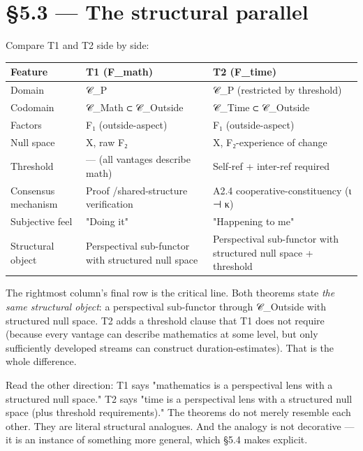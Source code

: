 \documentclass[11pt, openany]{book}
\newcommand{\sectionbreak}{\clearpage}
\begin{document}
\sectionbreak

\section{§5.3 --- The structural parallel}

Compare T1 and T2 side by side:

\begingroup\setlength{\tabcolsep}{3pt}\renewcommand{\arraystretch}{1.15}\footnotesize
\begin{center}
\begin{tabular}{p{0.62in} p{1.66in} p{2.05in}}
\toprule
Feature & T1 (F\_\allowbreak{}math) & T2 (F\_\allowbreak{}time) \\
\midrule
Domain & 𝒞\_\allowbreak{}P & 𝒞\_\allowbreak{}P (restricted by threshold) \\
Codomain & 𝒞\_\allowbreak{}Math ⊂ 𝒞\_\allowbreak{}Outside & 𝒞\_\allowbreak{}Time ⊂ 𝒞\_\allowbreak{}Outside \\
Factors & F₁ (outside-aspect) & F₁ (outside-aspect) \\
Null space & X, raw F₂ & X, F₂-experience of change \\
Threshold & --- (all vantages describe math) & Self-ref + inter-ref required \\
Consensus mechanism & Proof /\allowbreak  shared-structure verification & A2.4 cooperative-constituency (ι ⊣ κ) \\
Subjective feel & "Doing it" & "Happening to me" \\
Structural object & Perspectival sub-functor with structured null space & Perspectival sub-functor with structured null space + threshold \\
\bottomrule
\end{tabular}
\end{center}
\endgroup
The rightmost column's final row is the critical line. Both theorems state \textit{the same structural object}: a perspectival sub-functor through 𝒞\_\allowbreak{}Outside with structured null space. T2 adds a threshold clause that T1 does not require (because every vantage can describe mathematics at some level, but only sufficiently developed streams can construct duration-estimates). That is the whole difference.

Read the other direction: T1 says "mathematics is a perspectival lens with a structured null space." T2 says "time is a perspectival lens with a structured null space (plus threshold requirements)." The theorems do not merely resemble each other. They are literal structural analogues. And the analogy is not decorative --- it is an instance of something more general, which §5.4 makes explicit.
\end{document}
